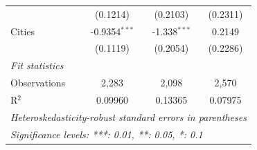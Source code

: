 \begin{tabular}{lccc}
                       & (0.1214)        & (0.2103)        & (0.2311)\\   
   Cities              & -0.9354$^{***}$ & -1.338$^{***}$  & 0.2149\\   
                       & (0.1119)        & (0.2054)        & (0.2286)\\   
   \midrule
   \emph{Fit statistics}\\
   Observations        & 2,283           & 2,098           & 2,570\\  
   R$^2$               & 0.09960         & 0.13365         & 0.07975\\  
   \midrule \midrule
   \multicolumn{4}{l}{\emph{Heteroskedasticity-robust standard errors in parentheses}}\\
   \multicolumn{4}{l}{\emph{Significance levels: ***: 0.01, **: 0.05, *: 0.1}}\\
\end{tabular}
\par\endgroup


